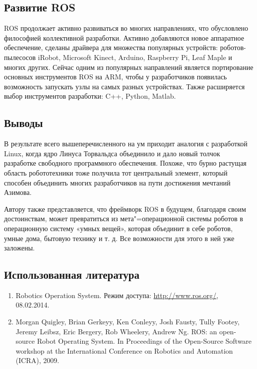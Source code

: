 \documentclass[10pt, a5paper]{article}
\begin{document}
\subsection*{Развитие ROS}

ROS продолжает активно развиваться во многих направлениях, что обусловлено философией коллективной разработки. Активно добавляются новое аппаратное обеспечение, сделаны драйвера для множества популярных устройств: роботов-пылесосов iRobot, Microsoft Kinect, Arduino, Raspberry Pi, Leaf Maple и многих других. Сейчас одним из популярных направлений является портирование основных инструментов ROS на ARM, чтобы у разработчиков появилась возможность запускать узлы на самых разных устройствах. Также расширяется выбор инструментов разработки: C++, Python, Matlab.

\subsection*{Выводы}

В результате всего вышеперечисленного на ум приходит аналогия с разработкой Linux, когда ядро Линуса Торвальдса объединило и дало новый толчок разработке свободного программного обеспечения. Похоже, что бурно растущая область робототехники тоже получила тот центральный элемент, который способен объединить  многих разработчиков на пути достижения мечтаний Азимова.

Автору также представляется, что фреймворк ROS в будущем, благодаря своим достоинствам, может превратиться из мета"=опера\-ционной системы роботов в  операционную систему «умных вещей», которая объединит в себе роботов, умные дома, бытовую технику и т. д. Все возможности для этого в ней уже заложены.

\subsection*{Использованная литература}
\begin{enumerate}
\item Robotics Operation System. Режим доступа: \url{http://www.ros.org/}, 08.02.2014.
\item Morgan Quigley, Brian Gerkeyy, Ken Conleyy, Josh Fausty, Tully Footey, Jeremy Leibsz, Eric Bergery, Rob Wheelery, Andrew Ng. ROS: an open-source Robot Operating System. In Proceedings of the Open-Source Software workshop at the International Confe\-rence on Robotics and Automation (ICRA), 2009.
\end{enumerate}
\end{document}
